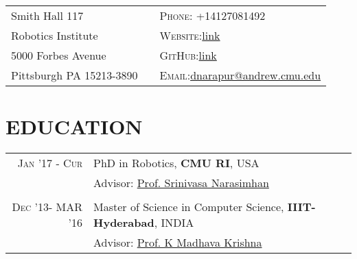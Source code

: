 \documentclass[7pt]{article}
\begin{document}
\begin{small}


\begin{table}[h!]

\begin{tabu}to 0.99\textwidth{X[l] X[c] X[l]}
Smith Hall 117 & & \textsc{Phone:} +14127081492 \\ 
Robotics Institute & & \textsc{Website:}\href{http://www.cs.cmu.edu/~dnarapur/} {link}\\
5000 Forbes Avenue & & \textsc{GitHub:}\href{https://github.com/dineshreddy91} {link} \\
Pittsburgh PA 15213-3890 & & \textsc{Email:}\href{dnarapur@andrew.cmu.edu} {dnarapur@andrew.cmu.edu}\\
\end{tabu}
\end{table}


\vspace{-4 mm}

\section{EDUCATION}
\begin{tabular}{rl}	
 \textsc{Jan '17 - Cur}  & PhD in Robotics, {\bf CMU RI}, USA \\
 
 & 
\normalsize \small Advisor: \href{http://www.cs.cmu.edu/~srinivas/} {Prof. Srinivasa Narasimhan} \\
 
  \vspace{-2 mm}
&\\


 \textsc{Dec} '13- {MAR} '16 & Master of Science in Computer Science, \textbf{IIIT-Hyderabad}, INDIA\\
& 
\normalsize  \small Advisor: \href{https://www.iiit.ac.in/people/faculty/mkrishna/} {Prof. K Madhava Krishna} \\


\end{tabular}
\end{small}
\end{document}
